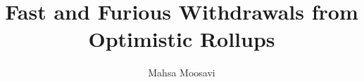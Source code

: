 \documentclass[a4pape,cleveref, autoref, thm-restate, anonymous]{lipics-v2021}
\title{Fast and Furious Withdrawals from Optimistic Rollups}
\author{Mahsa {Moosavi}}{Concordia University, Canada \and OffchainLabs, United States \and \url{http://https://mahsamoosavi.com} }{mmoosavi@offchainlabs.com}{}{(Optional) author-specific funding acknowledgements}
\begin{document}
\maketitle











\clearpage

\nocite{*}


\clearpage
\appendix
\end{document}
